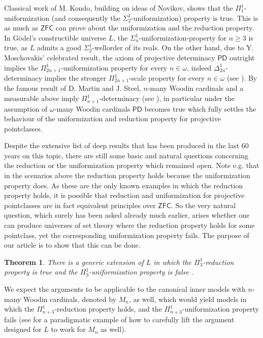 \documentclass[a4paper,11pt]{article}
\newtheorem*{theorem*}{Theorem}
\newcommand{\ZFC}{\mathsf{ZFC}}
\newcommand{\PD}{\mathsf{PD}}
\begin{document}
Classical work of M. Kondo, building on ideas of Novikov, shows that the $\Pi^1_1$-uniformization (and consequently the $\Sigma^1_2$-uniformization) property is true. This is as much as $\ZFC$ can prove about the uniformization and the reduction property.
In G\"odel's constructible universe $L$, the $\Sigma^1_n$-uniformization-property for $n \ge 3$ is true, as $L$ admits a good $\Sigma^1_2$-wellorder of its reals. On the other hand, due to Y. Moschovakis' celebrated result, the axiom of projective determinacy $\PD$ outright implies the $\Pi^1_{2n+1}$-uniformization property for every $n \in \omega$, indeed ${\Delta}^1_{2n}$-determinacy implies the stronger ${\Pi}^1_{2n+1}$-scale property for every $n \in \omega$ (see \cite{Moschovakis}). By the famous result of D. Martin and J. Steel, $n$-many Woodin cardinals and a measurable above imply $\Pi^1_{n+1}$-determinacy (see \cite{MS} ), in particular under the assumption of $\omega$-many Woodin cardinals $\PD$ becomes true which fully settles the behaviour of the uniformization and reduction property for projective pointclasses.

Despite the extensive list of deep results that has been produced in the last 60 years on this topic, there are still some basic and natural questions concerning the reduction or the uniformization property which remained open.
Note e.g. that in the scenarios above the reduction property holds because the uniformization property does. As these are the only known examples in which the reduction property holds, it is possible that reduction and uniformization for projective pointclasses are in fact equivalent principles over $\ZFC$. 
So the very natural question, which surely has been asked already much earlier, arises whether one can produce universes of set theory where the reduction property holds for some pointclass, yet the corresponding uniformization property fails.
The purpose of our article is to show that this can be done.

\begin{theorem*}
There is a generic extension of $L$ in which the $\Pi^1_3$-reduction property is true and the $\Pi^1_3$-uniformization property is false .
\end{theorem*} 
We expect the arguments to be applicable to the canonical inner models with $n$-many Woodin cardinals, denoted by $M_n$, as well, which would yield models in which the $\Pi^1_{n+3}$-reduction property holds, and the $\Pi^1_{n+3}$-uniformization property fails (see \cite{H2} for a paradigmatic example of how to carefully lift the argument designed for $L$ to work for $M_n$ as well).
\end{document}
